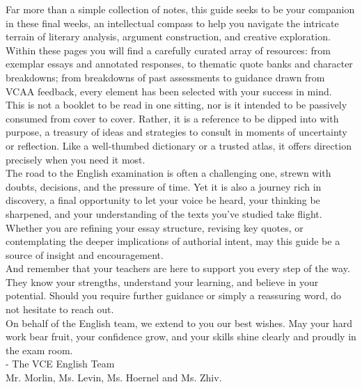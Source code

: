 \documentclass[a4paper]{article}
\begin{document}
Far more than a simple collection of notes, this guide seeks to be your companion in these final weeks, an intellectual compass to help you navigate the intricate terrain of literary analysis, argument construction, and creative exploration. Within these pages you will find a carefully curated array of resources: from exemplar essays and annotated responses, to thematic quote banks and character breakdowns; from breakdowns of past assessments to guidance drawn from VCAA feedback, every element has been selected with your success in mind.\\

This is not a booklet to be read in one sitting, nor is it intended to be passively consumed from cover to cover. Rather, it is a reference to be dipped into with purpose, a treasury of ideas and strategies to consult in moments of uncertainty or reflection. Like a well-thumbed dictionary or a trusted atlas, it offers direction precisely when you need it most.\\

The road to the English examination is often a challenging one, strewn with doubts, decisions, and the pressure of time. Yet it is also a journey rich in discovery, a final opportunity to let your voice be heard, your thinking be sharpened, and your understanding of the texts you’ve studied take flight. Whether you are refining your essay structure, revising key quotes, or contemplating the deeper implications of authorial intent, may this guide be a source of insight and encouragement.\\

And remember that your teachers are here to support you every step of the way. They know your strengths, understand your learning, and believe in your potential. Should you require further guidance or simply a reassuring word, do not hesitate to reach out.\\

On behalf of the English team, we extend to you our best wishes. May your hard work bear fruit, your confidence grow, and your skills shine clearly and proudly in the exam room.\\


 - The VCE English Team\\
 
Mr. Morlin, Ms. Levin, Ms. Hoernel and Ms. Zhiv.



\cleardoublepage

\clearpage
\thispagestyle{empty}
\hfill
\clearpage
\end{document}
